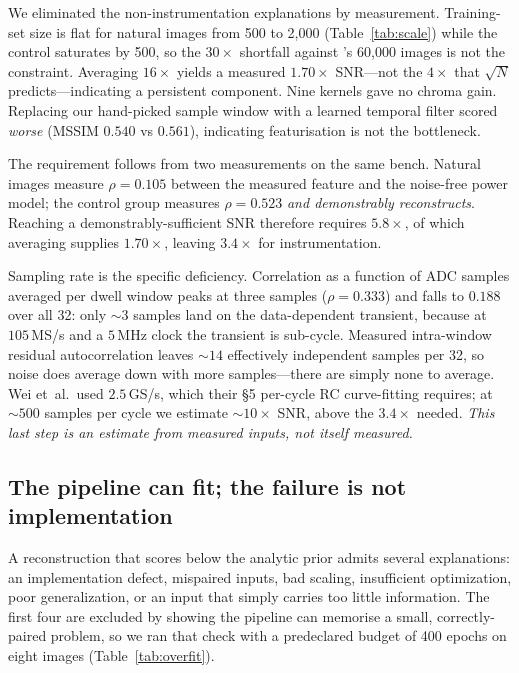 \documentclass[10pt,conference]{article}
\begin{document}
We eliminated the non-instrumentation explanations by measurement. Training-set size is
flat for natural images from 500 to 2{,}000 (Table~\ref{tab:scale}) while the control
saturates by 500, so the $30\times$ shortfall against \cite{huegle2023}'s 60{,}000 images
is not the constraint. Averaging $16\times$ yields a measured $1.70\times$ SNR---not the
$4\times$ that $\sqrt{N}$ predicts---indicating a persistent component. Nine kernels gave
no chroma gain. Replacing our hand-picked sample window with a learned temporal filter
scored \emph{worse} (MSSIM $0.540$ vs $0.561$), indicating featurisation is not the
bottleneck.

The requirement follows from two measurements on the same bench. Natural images measure
$\rho=0.105$ between the measured feature and the noise-free power model; the control
group measures $\rho=0.523$ \emph{and demonstrably reconstructs}. Reaching a
demonstrably-sufficient SNR therefore requires $5.8\times$, of which averaging supplies
$1.70\times$, leaving $3.4\times$ for instrumentation.

Sampling rate is the specific deficiency. Correlation as a function of ADC samples
averaged per dwell window peaks at three samples ($\rho=0.333$) and falls to $0.188$ over
all 32: only ${\sim}3$ samples land on the data-dependent transient, because at
$105$\,MS/s and a $5$\,MHz clock the transient is sub-cycle. Measured intra-window
residual autocorrelation leaves ${\sim}14$ effectively independent samples per 32, so
noise does average down with more samples---there are simply none to average.
Wei et~al.\ used $2.5$\,GS/s, which their \S5 per-cycle RC curve-fitting requires; at
${\sim}500$ samples per cycle we estimate ${\sim}10\times$ SNR, above the $3.4\times$
needed. \emph{This last step is an estimate from measured inputs, not itself measured.}

\subsection{The pipeline can fit; the failure is not implementation}

A reconstruction that scores below the analytic prior admits several explanations:
an implementation defect, mispaired inputs, bad scaling, insufficient optimization,
poor generalization, or an input that simply carries too little information. The first
four are excluded by showing the pipeline can memorise a small, correctly-paired
problem, so we ran that check with a predeclared budget of 400 epochs on eight images
(Table~\ref{tab:overfit}).
\end{document}
